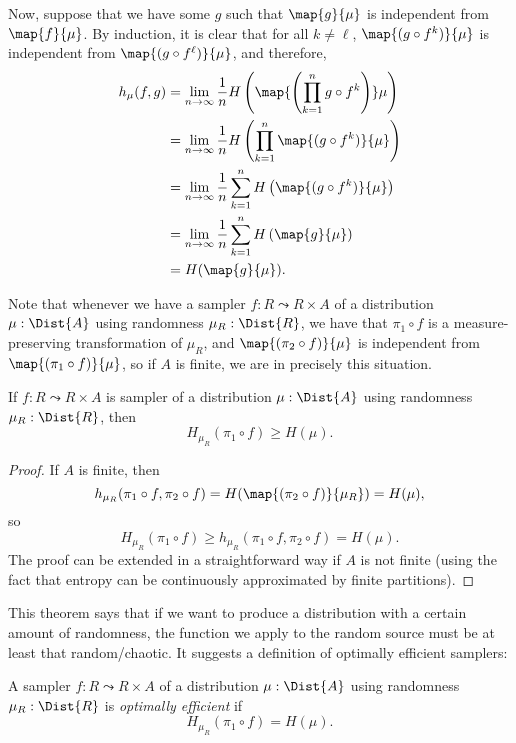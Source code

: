 Now, suppose that we have some $g$ such that $\map{g}{\mu}$ is independent from $\map{f}{\mu}$. By induction, it is clear that for all $k \ne \ell$, $\map{(g \circ f^k)}{\mu}$ is independent from $\map{(g \circ f^\ell)}{\mu}$, and therefore,
\begin{align*}
h_\mu(f, g) 
&= \lim_{n \to \infty} \frac{1}{n} H\left( \map{\left(\prod_{k = 1}^n g \circ f^k\right)} \mu \right)
\\ &= \lim_{n \to \infty} \frac{1}{n} H\left( \prod_{k = 1}^n \map{(g \circ f^k)}{\mu} \right)
\\ &= \lim_{n \to \infty} \frac{1}{n} \sum_{k = 1}^n H\left( \map{(g \circ f^k)}{\mu} \right)
\\ &= \lim_{n \to \infty} \frac{1}{n} \sum_{k = 1}^n H\left( \map{g}{\mu} \right)
\\ &= H(\map{g}{\mu}).
\end{align*}

Note that whenever we have a sampler $f : R \leadsto R \times A$ of a distribution $\mu : \Dist{A}$ using randomness $\mu_R : \Dist{R}$, we have that $\pi_1 \circ f$ is a measure-preserving transformation of $\mu_R$, and $\map{(\pi_2 \circ f)}{\mu}$ is independent from $\map{(\pi_1 \circ f)}{\mu}$, so if $A$ is finite, we are in precisely this situation.
\begin{theorem}
If $f : R \leadsto R \times A$ is sampler of a distribution $\mu : \Dist{A}$ using randomness $\mu_R : \Dist{R}$, then
\[
H_{\mu_R}(\pi_1 \circ f) \ge H(\mu).
\]
\end{theorem}
\begin{proof}
If $A$ is finite, then 
\[
h_{\mu_R}(\pi_1 \circ f, \pi_2 \circ f) = H(\map{(\pi_2 \circ f)}{\mu_R}) = H(\mu),
\]
so
\[
H_{\mu_R}(\pi_1 \circ f) \ge h_{\mu_R}(\pi_1 \circ f, \pi_2 \circ f) = H(\mu).
\]
The proof can be extended in a straightforward way if $A$ is not finite (using the fact that entropy can be continuously approximated by finite partitions).
\end{proof}

This theorem says that if we want to produce a distribution with a certain amount of randomness, the function we apply to the random source must be at least that random/chaotic. It suggests a definition of optimally efficient samplers:

\begin{definition}
A sampler $f : R \leadsto R \times A$ of a distribution $\mu : \Dist{A}$ using randomness $\mu_R : \Dist{R}$ is \emph{optimally efficient} if
\[
H_{\mu_R}(\pi_1 \circ f) = H(\mu).
\]
\end{definition}

